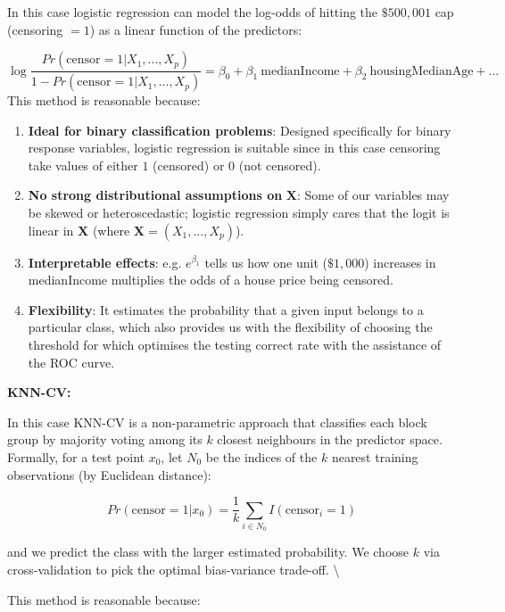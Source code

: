 \documentclass[
]{article}
\begin{document}
\noindent In this case logistic regression can model the log-odds of
hitting the \(\$500,001\) cap (censoring \(= 1\)) as a linear function
of the predictors: \vspace{-1em}

\[\log \frac{Pr(\text{censor} = 1 | X_1,...,X_p)}{1 - Pr(\text{censor} = 1 | X_1,...,X_p)} = \beta_{0} + \beta_{1} \ \text{medianIncome} + \beta_{2} \ \text{housingMedianAge} + ...\]
This method is reasonable because:

\begin{enumerate}
  \item \textbf{Ideal for binary classification problems}: Designed specifically for binary response variables, logistic regression is suitable since in this case censoring take values of either $1$ (censored) or $0$ (not censored).
  \item \textbf{No strong distributional assumptions on }$\boldsymbol{X}$: Some of our variables may be skewed or heteroscedastic; logistic   regression simply cares that the logit is linear in $\boldsymbol{X}$ (where $\boldsymbol{X} = (X_1, ..., X_p)$).
  \item \textbf{Interpretable effects}: e.g. $e^{\beta_{1}}$ tells us how one unit ($\$1,000$) increases in medianIncome multiplies the odds of a      house price being censored.
  \item \textbf{Flexibility}: It estimates the probability that a given input belongs to a particular class, which also provides us with the flexibility of choosing the threshold for which optimises the testing correct rate with the assistance of the ROC curve.
\end{enumerate}

\noindent \large \textbf{KNN-CV:} \normalsize

\noindent In this case KNN-CV is a non-parametric approach that
classifies each block group by majority voting among its \(k\) closest
neighbours in the predictor space. Formally, for a test point \(x_0\),
let \(N_0\) be the indices of the \(k\) nearest training observations
(by Euclidean distance):

\[Pr(\text{censor} = 1|x_0) = \frac{1}{k}\sum_{i\in N_0}I(\text{censor}_i = 1)\]

\noindent and we predict the class with the larger estimated
probability. We choose \(k\) via cross-validation to pick the optimal
bias-variance trade-off. \textbackslash{}

\noindent This method is reasonable because:
\end{document}
